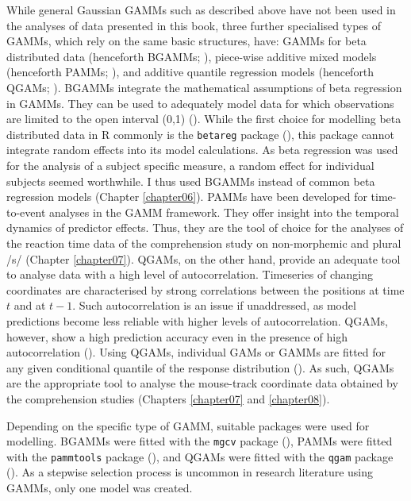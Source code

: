 While general Gaussian GAMMs such as described above have not been used in the analyses of data presented in this book, three further specialised types of GAMMs, which rely on the same basic structures, have: GAMMs for beta distributed data (henceforth BGAMMs; \cite{Wood2017}), piece-wise additive mixed models (henceforth PAMMs; \cite{Bender2018a}), and additive quantile regression models (henceforth QGAMs; \cite{Fasiolo2021}). BGAMMs integrate the mathematical assumptions of beta regression in GAMMs. They can be used to adequately model data for which observations are limited to the open interval (0,1) (\cite{Ferrari2004, Smithson2006}). While the first choice for modelling beta distributed data in R commonly is the \texttt{betareg} package (\cite{Cribari2010}), this package cannot integrate random effects into its model calculations. As beta regression was used for the analysis of a subject specific measure, a random effect for individual subjects seemed worthwhile. I thus used BGAMMs instead of common beta regression models (Chapter \ref{chapter06}). PAMMs have been developed for time-to-event analyses in the GAMM framework. They offer insight into the temporal dynamics of predictor effects. Thus, they are the tool of choice for the analyses of the reaction time data of the comprehension study on non-morphemic and plural /s/ (Chapter \ref{chapter07}). QGAMs, on the other hand, provide an adequate tool to analyse data with a high level of autocorrelation. Timeseries of changing coordinates are characterised by strong correlations between the positions at time $t$ and at $t-1$. Such autocorrelation is an issue if unaddressed, as model predictions become less reliable with higher levels of autocorrelation. QGAMs, however, show a high prediction accuracy even in the presence of high autocorrelation (\cite{Fasiolo2021}). Using QGAMs, individual GAMs or GAMMs are fitted for any given conditional quantile of the response distribution (\cite{Tomaschek2021}). As such, QGAMs are the appropriate tool to analyse the mouse-track coordinate data obtained by the comprehension studies (Chapters \ref{chapter07} and \ref{chapter08}). 

Depending on the specific type of GAMM, suitable packages were used for modelling. BGAMMs were fitted with the \texttt{mgcv} package (\cite{Wood2017}), PAMMs were fitted with the \texttt{pammtools} package (\cite{Bender2018a}), and QGAMs were fitted with the \texttt{qgam} package (\cite{Fasiolo2021}). As a stepwise selection process is uncommon in research literature using GAMMs, only one model was created.

